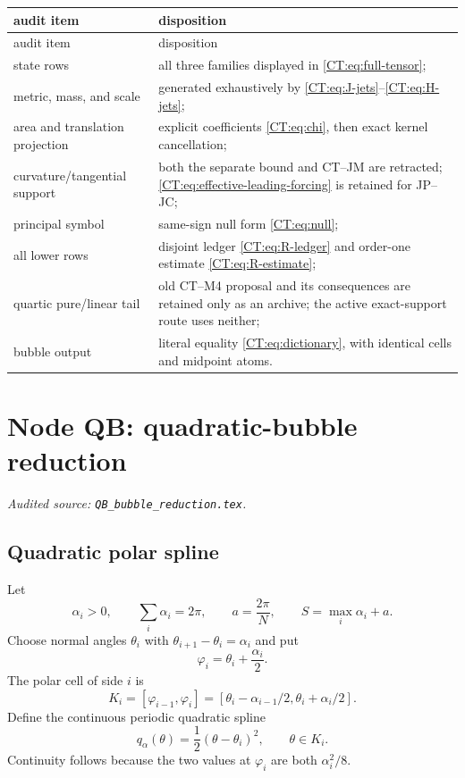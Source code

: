 \documentclass[11pt]{amsart}
\numberwithin{equation}{section}
\theoremstyle{definition}
\theoremstyle{remark}
\begin{document}
\begin{center}
\begin{longtable}{>{\raggedright\arraybackslash}p{.30\linewidth}
                  >{\raggedright\arraybackslash}p{.58\linewidth}}
\toprule
audit item & disposition\\
\midrule
\endfirsthead
\toprule
audit item & disposition\\
\midrule
\endhead
state rows & all three families displayed in \eqref{CT:eq:full-tensor};\\
metric, mass, and scale & generated exhaustively by
\eqref{CT:eq:J-jets}--\eqref{CT:eq:H-jets};\\
area and translation projection & explicit coefficients
\eqref{CT:eq:chi}, then exact kernel cancellation;\\
curvature/tangential support & both the separate bound and CT--JM are
retracted; \eqref{CT:eq:effective-leading-forcing} is retained for JP--JC;\\
principal symbol & same-sign null form \eqref{CT:eq:null};\\
all lower rows & disjoint ledger \eqref{CT:eq:R-ledger} and
order-one estimate \eqref{CT:eq:R-estimate};\\
quartic pure/linear tail & old CT--M4 proposal and its consequences are
retained only as an archive; the active exact-support route uses neither;\\
bubble output & literal equality \eqref{CT:eq:dictionary}, with identical
cells and midpoint atoms.\\
\bottomrule
\end{longtable}
\end{center}
\endgroup

\begingroup
\section{Node QB: quadratic-bubble reduction}
\label{module:QB}
\noindent\textit{Audited source: \nolinkurl{QB_bubble_reduction.tex}.}
\subsection{Quadratic polar spline}

Let
\begin{equation}\label{QB:eq:fan}
 \alpha_i>0,\qquad \sum_i\alpha_i=2\pi,
 \qquad a=\frac{2\pi}{N},\qquad S=\max_i\alpha_i+a.
\end{equation}
Choose normal angles $\theta_i$ with
$\theta_{i+1}-\theta_i=\alpha_i$ and put
\begin{equation}\label{QB:eq:vertex}
 \varphi_i=\theta_i+\frac{\alpha_i}{2}.
\end{equation}
The polar cell of side $i$ is
\begin{equation}\label{QB:eq:cell}
 K_i=[\varphi_{i-1},\varphi_i]
 =[\theta_i-\alpha_{i-1}/2,\theta_i+\alpha_i/2].
\end{equation}
Define the continuous periodic quadratic spline
\begin{equation}\label{QB:eq:q}
 q_\alpha(\theta)=\frac12(\theta-\theta_i)^2,
 \qquad \theta\in K_i.
\end{equation}
Continuity follows because the two values at $\varphi_i$ are both
$\alpha_i^2/8$.
\end{document}
